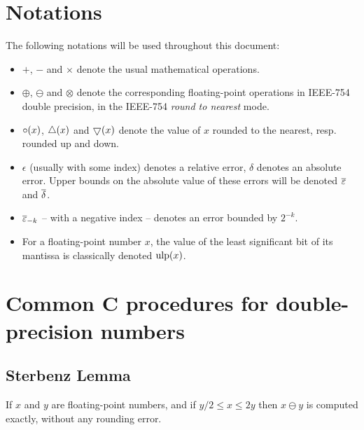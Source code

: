 
\section{Notations\label{section:notations}}


The following notations will be used throughout this document:
\begin{itemize}

\item  $+$, $-$ and  $\times$ denote the usual
mathematical operations.

\item $\oplus$, $\ominus$ and $\otimes$ denote the
corresponding floating-point operations in IEEE-754 double precision,
in the IEEE-754 \emph{round to nearest} mode.

\item $\circ(x)$, $\bigtriangleup(x)$ and $\bigtriangledown(x)$ denote the value
  of $x$ rounded to the nearest, resp. rounded up and down.
  
\item $\epsilon$ (usually with some index) denotes a relative error,
  $\delta$ denotes an absolute error. Upper bounds on the absolute value of these errors
  will be denoted ${\overline{\varepsilon}}$ and ${\overline{\delta}}$.

\item ${\overline{\varepsilon}}_{-k}$ -- with a negative index -- denotes an error bounded by $2^{-k}$.
  
\item For a floating-point number $x$, the value of the least
  significant bit of its mantissa is classically denoted $\mbox{ulp}(x)$.

\end{itemize}




\section{Common C procedures  for double-precision numbers\label{section:commonCdouble}}

\subsection{Sterbenz Lemma \label{sec:sterbenz}}

\begin{theorem}
\label{sterbenz}
If $x$ and $y$ are floating-point numbers, and if ${y}/{2} \leq x \leq 2y$ then $x\ominus y$ is computed exactly, without any rounding error.
\end{theorem}


